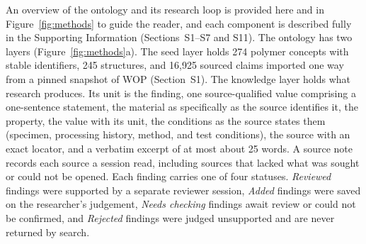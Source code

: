 \documentclass[journal=mamobx,manuscript=article]{achemso}
\begin{document}
An overview of the ontology and its research loop is provided here and in Figure~\ref{fig:methods} to guide the reader, and each component is described fully in the Supporting Information (Sections~S1--S7 and S11).
The ontology has two layers (Figure~\ref{fig:methods}a).
The seed layer holds 274 polymer concepts with stable identifiers, 245 structures, and 16,925 sourced claims imported one way from a pinned snapshot of WOP (Section~S1).
The knowledge layer holds what research produces.
Its unit is the finding, one source-qualified value comprising a one-sentence statement, the material as specifically as the source identifies it, the property, the value with its unit, the conditions as the source states them (specimen, processing history, method, and test conditions), the source with an exact locator, and a verbatim excerpt of at most about 25 words.
A source note records each source a session read, including sources that lacked what was sought or could not be opened.
Each finding carries one of four statuses.
\emph{Reviewed} findings were supported by a separate reviewer session, \emph{Added} findings were saved on the researcher's judgement, \emph{Needs checking} findings await review or could not be confirmed, and \emph{Rejected} findings were judged unsupported and are never returned by search.
\end{document}
